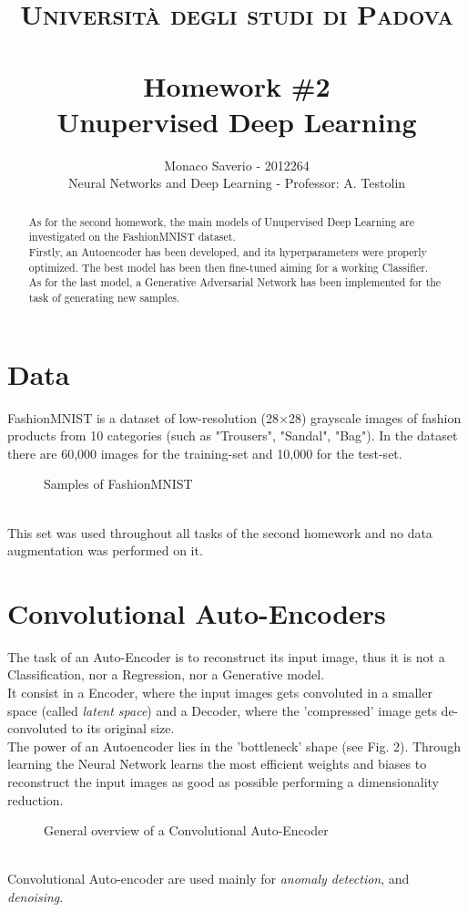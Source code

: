 \documentclass[11pt,a4paper,twocolumn]{IEEEtran}
\author{Monaco Saverio - 2012264 \sepline \\Neural Networks and Deep Learning - Professor: A. Testolin}
\title{{\normalsize\textsc{Università degli studi di Padova}}\vspace{-.5cm} \\ \sepline\\ \textbf{Homework \#2
\\ Unupervised Deep Learning}}
\begin{document}
	\maketitle
	\begin{abstract} As for the second homework, the main models of Unupervised Deep Learning are investigated on the FashionMNIST dataset.\\ 
	Firstly, an Autoencoder has been developed, and its hyperparameters were properly optimized. The best model has been then fine-tuned aiming for a working Classifier.\\
	As for the last model, a Generative Adversarial Network has been implemented for the task of generating new samples.
	\end{abstract}
	\section*{Data}
	FashionMNIST is a dataset of low-resolution (28$\times$28) grayscale images of fashion products from 10 categories (such as "Trousers", "Sandal", "Bag"). In the dataset there are 60,000 images for the training-set and 10,000 for the test-set.\vspace*{-.5cm}
	\begin{figure}[h]
		\centering
		
		\caption{Samples of FashionMNIST}
	\end{figure}\\
	This set was used throughout all tasks of the second homework and no data augmentation was performed on it.
	\section{\textbf{Convolutional Auto-Encoders}}
	The task of an Auto-Encoder is to reconstruct its input image, thus it is not a Classification, nor a Regression, nor a Generative model.\\
	It consist in a Encoder, where the input images gets convoluted in a smaller space (called \textit{latent space}) and a Decoder, where the 'compressed' image gets de-convoluted to its original size.\\ The power of an Autoencoder lies in the 'bottleneck' shape (see Fig. 2). Through learning the Neural Network learns the most efficient weights and biases to reconstruct the input images as good as possible performing a dimensionality reduction.	
		\begin{figure}[h]
			\centering
			{\scriptsize
			 }
			\caption{General overview of a Convolutional Auto-Encoder}
		\end{figure}\\
	Convolutional Auto-encoder are used mainly for \textit{anomaly detection}, and \textit{denoising}.
\end{document}
